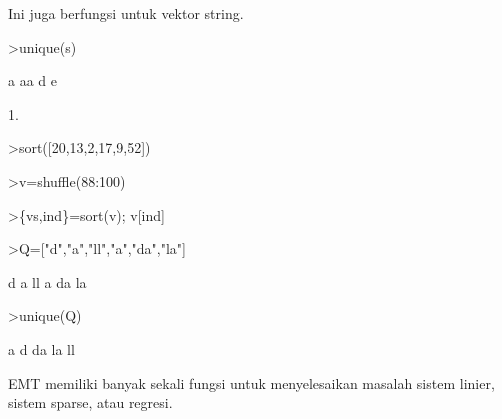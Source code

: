 \documentclass[a4paper,10pt]{article}
\begin{document}
\begin{eulernotebook}
\begin{eulercomment}
\begin{eulercomment}
\begin{eulercomment}
\begin{eulercomment}
\begin{eulercomment}
\begin{eulercomment}
\begin{eulercomment}
\begin{eulercomment}
\begin{eulercomment}
Ini juga berfungsi untuk vektor string.
\end{eulercomment}
\begin{eulerprompt}
>unique(s)
\end{eulerprompt}
\begin{euleroutput}
  a
  aa
  d
  e
\end{euleroutput}
\begin{eulercomment}
1.
\end{eulercomment}
\begin{eulerprompt}
>sort([20,13,2,17,9,52])
\end{eulerprompt}
\begin{euleroutput}
  [2,  9,  13,  17,  20,  52]
\end{euleroutput}
\begin{eulerprompt}
>v=shuffle(88:100)
\end{eulerprompt}
\begin{euleroutput}
  [95,  93,  99,  97,  91,  98,  96,  94,  90,  88,  89,  100,  92]
\end{euleroutput}
\begin{eulerprompt}
>\{vs,ind\}=sort(v); v[ind]
\end{eulerprompt}
\begin{euleroutput}
  [88,  89,  90,  91,  92,  93,  94,  95,  96,  97,  98,  99,  100]
\end{euleroutput}
\begin{eulerprompt}
>Q=["d","a","ll","a","da","la"]
\end{eulerprompt}
\begin{euleroutput}
  d
  a
  ll
  a
  da
  la
\end{euleroutput}
\begin{eulerprompt}
>unique(Q)
\end{eulerprompt}
\begin{euleroutput}
  a
  d
  da
  la
  ll
\end{euleroutput}
\begin{eulercomment}
EMT memiliki banyak sekali fungsi untuk menyelesaikan masalah sistem
linier, sistem sparse, atau regresi.


\end{eulercomment}
\end{eulercomment}
\end{eulercomment}
\end{eulercomment}
\end{eulercomment}
\end{eulercomment}
\end{eulercomment}
\end{eulercomment}
\end{eulercomment}
\end{eulernotebook}
\end{document}

